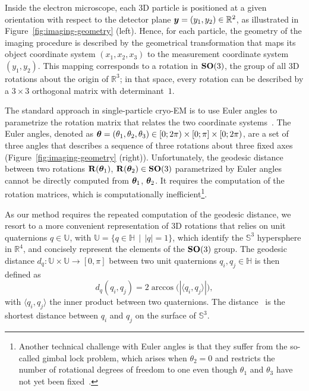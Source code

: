 Inside the electron microscope, each 3D particle is positioned at a given orientation with respect to the detector plane ${\boldsymbol{y}}=(y_1,y_2)\in \mathbb{R}^2$, as illustrated in Figure~\ref{fig:imaging-geometry} (left). Hence, for each particle, the geometry of the imaging procedure is described by the geometrical transformation that maps its object coordinate system $(x_1,x_2,x_3)$ to the measurement coordinate system $(y_1,y_2)$. This mapping corresponds to a rotation in $\mathrm{\mathbf{SO}}(3)$, the group of all 3D rotations about the origin of $\mathbb{R}^3$; in that space, every rotation can be described by a $3\times3$ orthogonal matrix with determinant~$1$. 

The standard approach in single-particle cryo-EM is to use Euler angles to parametrize the rotation matrix that relates the two coordinate systems~\cite{sorzano2014interchanging}. The Euler angles, denoted as ${\boldsymbol{\theta}}=(\theta_1,\theta_2,\theta_3)\in [0;2\pi)\times [0;\pi] \times [0;2\pi)$, are a set of three angles that describes a sequence of three rotations about three fixed axes (Figure~\ref{fig:imaging-geometry} (right)). 
Unfortunately, the geodesic distance between two rotations $\mathbf{R}({\boldsymbol{\theta}}_1)$, $\mathbf{R}({\boldsymbol{\theta}}_2)\in \mathrm{\mathbf{SO}}(3)$ parametrized by Euler angles cannot be directly computed from ${\boldsymbol{\theta}}_1$, ${\boldsymbol{\theta}}_2$.
It requires the computation of the rotation matrices, which is computationally inefficient\footnote{Another technical challenge with Euler angles is that they suffer from the so-called gimbal lock problem, which arises when $\theta_2=0$ and restricts the number of rotational degrees of freedom to one even though $\theta_1$ and $\theta_3$ have not yet been fixed~\cite{koks2006explorations}.}.

As our method requires the repeated computation of the geodesic distance, we resort to a more convenient representation of 3D rotations that relies on unit quaternions $q\in\mathbb{U}$, with  $\mathbb{U}=\big\{q\in\mathbb{H} \; \, | \; \,\lvert q \rvert =1\big\}$, which identify the $\mathbb{S}^3$ hypersphere in  $\mathbb{R}^4$, and concisely represent the elements of the $\mathrm{\mathbf{SO}}(3)$ group. The geodesic distance $d_q:\mathbb{U}\times\mathbb{U}\rightarrow [0,\pi]$ between two unit quaternions $q_i, q_j\in\mathbb{H}$ is then defined as
\begin{equation}
    d_q(q_i, q_j) = 2 \arccos \big(| \langle q_i, q_j \rangle| \big),
    \label{eqn:distance:orientations}
\end{equation}
with $\langle q_i, q_j \rangle$ the inner product between two quaternions.
The distance~ is the shortest distance between $q_i$ and $q_j$ on the surface of $\mathbb{S}^3$.

